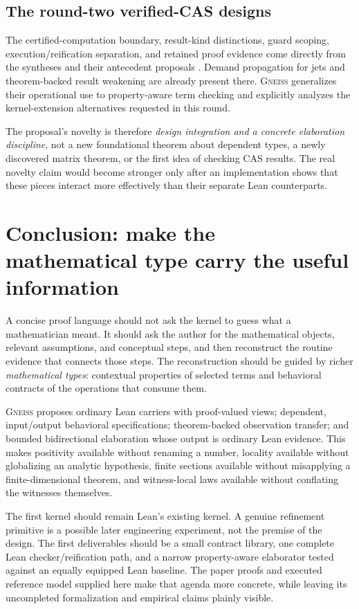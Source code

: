 \documentclass[11pt,letterpaper]{article}
\newcommand{\Gneiss}{\textsc{Gneiss}}
\theoremstyle{definition}
\theoremstyle{remark}
\begin{document}
\subsection{The round-two verified-CAS designs}
The certified-computation boundary, result-kind distinctions, guard scoping,
execution/reification separation, and retained proof evidence come directly
from the syntheses and their antecedent proposals \cite{syn-a,syn-b}. Demand
propagation for jets and theorem-backed result weakening are already present
there. \Gneiss{} generalizes their operational use to property-aware term
checking and explicitly analyzes the kernel-extension alternatives requested
in this round.

The proposal's novelty is therefore \emph{design integration and a concrete
elaboration discipline}, not a new foundational theorem about dependent types,
a newly discovered matrix theorem, or the first idea of checking CAS results.
The real novelty claim would become stronger only after an implementation
shows that these pieces interact more effectively than their separate Lean
counterparts.

\section{Conclusion: make the mathematical type carry the useful information}

A concise proof language should not ask the kernel to guess what a mathematician
meant. It should ask the author for the mathematical objects, relevant
assumptions, and conceptual steps, and then reconstruct the routine evidence
that connects those steps. The reconstruction should be guided by richer
\emph{mathematical types}: contextual properties of selected terms and
behavioral contracts of the operations that consume them.

\Gneiss{} proposes ordinary Lean carriers with proof-valued views; dependent,
input/output behavioral specifications; theorem-backed observation transfer;
and bounded bidirectional elaboration whose output is ordinary Lean evidence.
This makes positivity available without renaming a number, locality available
without globalizing an analytic hypothesis, finite sections available without
misapplying a finite-dimensional theorem, and witness-local laws available
without conflating the witnesses themselves.

The first kernel should remain Lean's existing kernel. A genuine refinement
primitive is a possible later engineering experiment, not the premise of the
design. The first deliverables should be a small contract library, one complete
Lean checker/reification path, and a narrow property-aware elaborator tested
against an equally equipped Lean baseline. The paper proofs and executed
reference model supplied here make that agenda more concrete, while leaving
its uncompleted formalization and empirical claims plainly visible.
\end{document}
